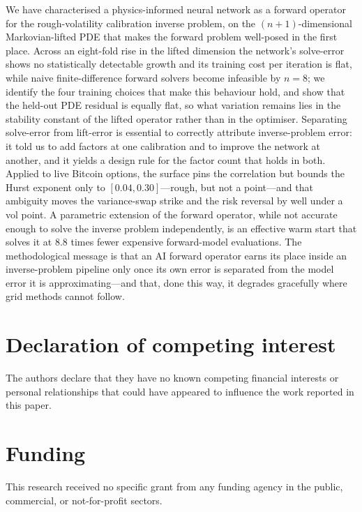 \documentclass[preprint,12pt]{elsarticle}
\begin{document}
We have characterised a physics-informed neural network as a forward operator
for the rough-volatility calibration inverse problem, on the
$(n{+}1)$-dimensional Markovian-lifted PDE that makes the forward problem
well-posed in the first place. Across an eight-fold rise in the lifted
dimension the network's solve-error shows no statistically detectable growth
and its training cost per iteration is flat, while naive finite-difference
forward solvers become infeasible by $n{=}8$; we identify the four training
choices that make this behaviour hold, and show that the held-out PDE residual
is equally flat, so what variation remains lies in the stability constant of the
lifted operator rather than in the optimiser. Separating solve-error from
lift-error is essential to correctly attribute inverse-problem error: it told us
to add factors at one calibration and to improve the network at another, and it
yields a design rule for the factor count that holds in both. Applied to live
Bitcoin options, the surface pins the correlation but bounds the Hurst exponent
only to $[0.04,0.30]$---rough, but not a point---and that ambiguity moves the
variance-swap strike and the risk reversal by well under a vol point. A
parametric extension of the forward operator, while not accurate enough to solve
the inverse problem independently, is an effective warm start that solves it at
$8.8$ times fewer expensive forward-model evaluations. The methodological message is that an AI forward operator earns
its place inside an inverse-problem pipeline only once its own error is
separated from the model error it is approximating---and that, done this way,
it degrades gracefully where grid methods cannot follow.

\section*{Declaration of competing interest}

The authors declare that they have no known competing financial interests or
personal relationships that could have appeared to influence the work reported in
this paper.

\section*{Funding}

This research received no specific grant from any funding agency in the public,
commercial, or not-for-profit sectors.
\end{document}
